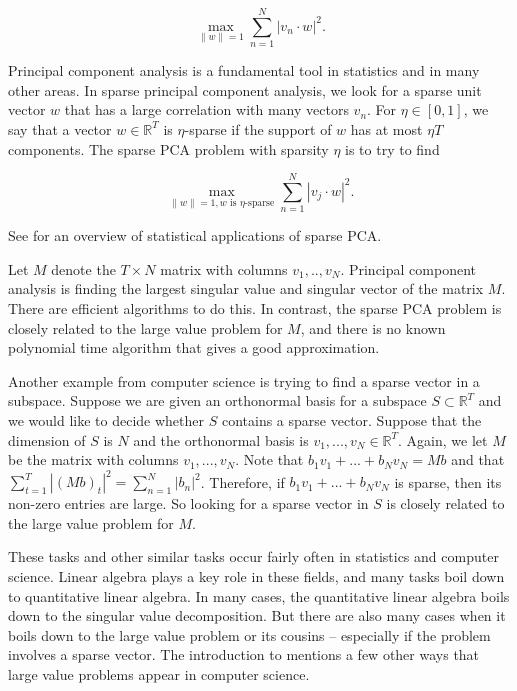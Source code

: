 \documentclass{amsart}
\newcommand{\RR}{\mathbb{R}}
\begin{document}
\begin{equation} \label{pca} \max_{\| w \| =1 } \sum_{n = 1}^N | v_n \cdot w |^2. 
\end{equation}

\noindent Principal component analysis is a fundamental tool in statistics and in many other areas.   In sparse principal component analysis,  we look for a sparse unit vector $w$ that has a large correlation with many vectors $v_n$.   For $\eta \in [0,1]$,  we say that a vector $w \in \RR^T$ is $\eta$-sparse if the support of $w$ has at most $\eta T$ components.   The sparse PCA problem with sparsity $\eta$ is to try to find

\begin{equation} \label{spca} \max_{\| w \| =1, w \textrm{ is $\eta$-sparse} } \sum_{n = 1}^N | v_j \cdot w |^2. 
\end{equation}

See \cite{XZ} for an overview of statistical applications of sparse PCA.   

Let $M$ denote the $T \times N$ matrix with columns $v_1, .., v_N$.   Principal component analysis is finding the largest singular value and singular vector of the matrix $M$.  There are efficient algorithms to do this.  In contrast, the sparse PCA problem is closely related to the large value problem for $M$, and there is no known polynomial time algorithm that gives a good approximation.

Another example from computer science is trying to find a sparse vector in a subspace.    Suppose we are given an orthonormal basis for a subspace $S \subset \RR^T$ and we would like to decide whether $S$ contains a sparse vector.   Suppose that the dimension of $S$ is $N$ and the orthonormal basis is $v_1, ..., v_N \in \RR^T$.    Again,  we let $M$ be the matrix with columns $v_1, ..., v_N$.   Note that $b_1 v_1 + ... + b_N v_N = Mb$ and that $\sum_{t=1}^T |(Mb)_t|^2 = \sum_{n=1}^N |b_n|^2$.  Therefore,  if $b_1 v_1 + ... + b_N v_N$ is sparse,  then its non-zero entries are large.   So looking for a sparse vector in $S$ is closely related to the large value problem for $M$.

These tasks and other similar tasks occur fairly often in statistics and computer science.   Linear algebra plays a key role in these fields,  and many tasks boil down to quantitative linear algebra.  In many cases, the quantitative linear algebra boils down to the singular value decomposition.  But there are also many cases when it boils down to the large value problem or its cousins -- especially if the problem involves a sparse vector.  The introduction to \cite{DHPT} mentions a few other ways that large value problems appear in computer science.  
\end{document}
